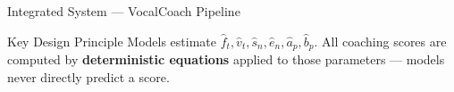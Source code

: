 \documentclass[aspectratio=169,9pt]{beamer}
\newcommand{\fh}{\hat{f}}
\newcommand{\vh}{\hat{v}}
\newcommand{\sh}{\hat{s}}
\newcommand{\eh}{\hat{e}}
\newcommand{\ah}{\hat{a}}
\newcommand{\bh}{\hat{b}}
\begin{document}
\begin{frame}{Integrated System --- VocalCoach Pipeline}
  \medskip
  \begin{alertblock}{Key Design Principle}
    \small
    Models estimate $\fh_t, \vh_t, \sh_n, \eh_n, \ah_p, \bh_p$.
    All coaching scores are computed by \textbf{deterministic equations}
    applied to those parameters — models never directly predict a score.
  \end{alertblock}
\end{frame}
\end{document}
